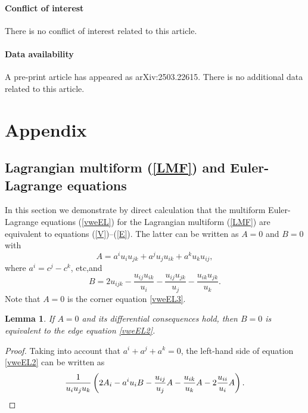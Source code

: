 \documentclass[12pt, a4paper]{article}
\newtheorem{lemma}[theorem]{Lemma}
\theoremstyle{definition}
\begin{document}
\paragraph{Conflict of interest} There is no conflict of interest related to this article.

\paragraph{Data availability} A pre-print article has appeared as arXiv:2503.22615. There is no additional data related to this article.


\appendix
\section*{Appendix}
\setcounter{section}{1}

\subsection{Lagrangian multiform (\ref{LMF}) and Euler-Lagrange equations}
\label{app-vwe}

In this section we demonstrate by direct calculation that the multiform Euler-Lagrange equations (\ref{vweEL}) for the Lagrangian multiform (\ref{LMF}) are equivalent to equations (\ref{V})--(\ref{E}). The latter can be written as $A = 0$ and $B = 0$ with
\[ A= a^i u_i u_{jk} + a^j u_j u_{ik} + a^k u_k u_{ij} , \]
where $a^i=c^j-c^k$, etc,\@ and
\[ B= 2 u_{ijk} - \frac{{u_{ij}} {u_{ik}}}{{u_{i}}} - \frac{{u_{ij}} {u_{jk}}}{{u_{j}}} - \frac{{u_{ik}} {u_{jk}}}{{u_{k}}} . \]
Note that $A = 0$ is the corner equation \eqref{vweEL3}.

\begin{lemma}
	\label{lemma-A1}
	If $A = 0$ and its differential consequences hold, then $B = 0$ is equivalent to the edge equation \eqref{vweEL2}.
\end{lemma}
\begin{proof}
	Taking into account that $a^i+a^j+a^k = 0$, the left-hand side of equation \eqref{vweEL2} can be written as
	\[ \frac{1}{u_i u_j u_k} \left( 2 A_i - a^i u_i B - \frac{u_{ij}}{u_j} A - \frac{u_{ik}}{u_k} A - 2 \frac{u_{ii}}{u_i} A \right) . \qedhere \]
\end{proof}
\end{document}
